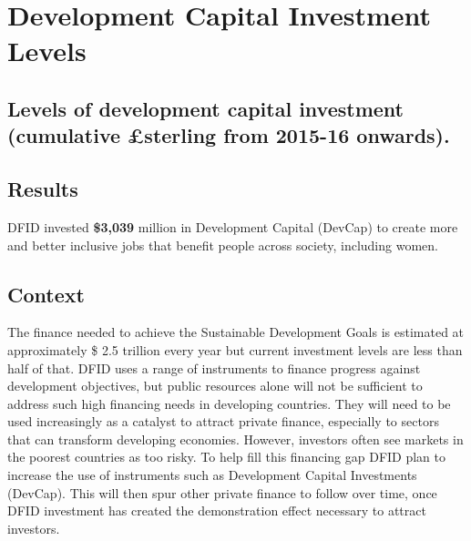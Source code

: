 \chapter{Development Capital Investment Levels}

\section*{Levels of development capital investment (cumulative \pounds sterling from 2015-16 onwards).}

\thispagestyle{empty}

\bigskip
\bigskip

\section{Results}
DFID invested \textbf{\$3,039} million in Development Capital (DevCap) to create more and better inclusive jobs that benefit people across society, including women.

\section{Context}

The finance needed to achieve the Sustainable Development Goals is estimated at approximately \$ 2.5 trillion every year but current investment levels are less than half of that. %
DFID uses a range of instruments to finance progress against development objectives, but public resources alone will not be sufficient to address such high financing needs in developing countries. %
They will need to be used increasingly as a catalyst to attract private finance, especially to sectors that can transform developing
economies. %
However, investors often see markets in the poorest countries as too risky. %
To help fill this financing gap DFID plan to increase the use of instruments such as Development Capital Investments (DevCap). %
This will then spur other private finance to follow over time, once DFID investment has created the demonstration effect necessary to attract investors. %

\newpage
